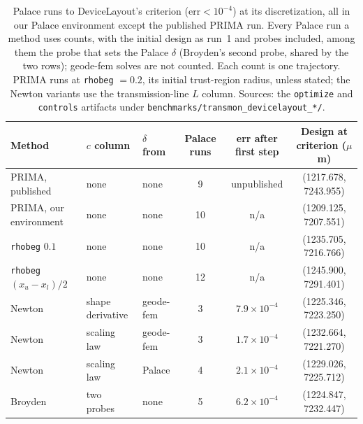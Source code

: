 \documentclass{anvil-paper}
\begin{document}
\begin{table}[htbp]
  \centering
  \caption{Palace runs to DeviceLayout's criterion ($\mathrm{err} <
  10^{-4}$) at its discretization, all in our Palace environment except the
  published PRIMA run. Every Palace run a method uses counts, with the
  initial design as run~1 and probes included, among them the probe that
  sets the Palace $\delta$ (Broyden's second probe, shared by the two
  rows); geode-fem solves are not counted. Each count is one trajectory.
  PRIMA runs at \texttt{rhobeg} $= 0.2$, its initial trust-region radius,
  unless stated; the Newton variants
  use the transmission-line $L$ column.
  Sources: the \texttt{optimize} and \texttt{controls} artifacts under
  \texttt{benchmarks/transmon\_devicelayout\_*/}.}
  \label{tab:controls}
  \footnotesize
  \setlength{\tabcolsep}{4pt}
  \begin{tabular}{@{}lllccc@{}}
    \toprule
    Method & $c$ column & $\delta$ from & Palace runs & err after first step & Design at criterion ($\mu$m) \\
    \midrule
    PRIMA, published & none & none & 9 & unpublished & (1217.678, 7243.955) \\
    PRIMA, our environment & none & none & 10 & n/a & (1209.125, 7207.551) \\
    \quad \texttt{rhobeg} $0.1$ & none & none & 10 & n/a & (1235.705, 7216.766) \\
    \quad \texttt{rhobeg} $(x_u - x_l)/2$ & none & none & 12 & n/a & (1245.900, 7291.401) \\
    Newton & shape derivative & geode-fem & 3 & $7.9\times10^{-4}$ & (1225.346, 7223.250) \\
    Newton & scaling law & geode-fem & 3 & $1.7\times10^{-4}$ & (1232.664, 7221.270) \\
    Newton & scaling law & Palace & 4 & $2.1\times10^{-4}$ & (1229.026, 7225.712) \\
    Broyden & two probes & none & 5 & $6.2\times10^{-4}$ & (1224.847, 7232.447) \\
    \bottomrule
  \end{tabular}
\end{table}
\end{document}
